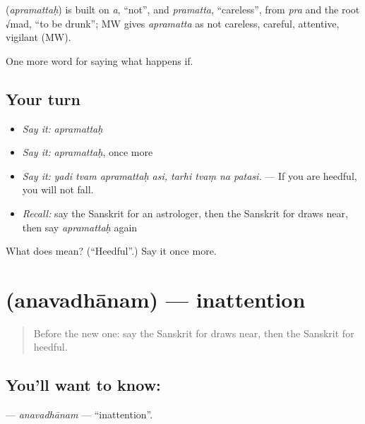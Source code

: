 \begin{cousinweb}
\textbf{} (\emph{apramattaḥ}) is built on \emph{a}, \textquotedblleft{}not\textquotedblright{}, and \emph{pramatta}, \textquotedblleft{}careless\textquotedblright{}, from \emph{pra} and the root √mad, \textquotedblleft{}to be drunk\textquotedblright{}; MW gives \emph{apramatta} as not careless, careful, attentive, vigilant (MW).
\end{cousinweb}

\begin{grammarlens}[title={What you've built}]
One more word for saying what happens if.
\end{grammarlens}

\subsection*{Your turn}
\begin{itemize}
\raggedright
  \item \emph{Say it:} \emph{apramattaḥ}
  \item \emph{Say it:} \emph{apramattaḥ}, once more
  \item \emph{Say it:} \emph{yadi tvam apramattaḥ asi, tarhi tvaṃ na patasi.} — If you are heedful, you will not fall.
  \item \emph{Recall:} say the Sanskrit for an astrologer, then the Sanskrit for draws near, then say \emph{apramattaḥ} again
\end{itemize}

\begin{tcolorbox}[breakable,colback=teal!4,colframe=teal!35!black,title={Before you move on}]
What does  mean? (\textquotedblleft{}Heedful\textquotedblright{}.) Say it once more.
\end{tcolorbox}
\section[\texorpdfstring{\sk{अनवधानम्} (anavadhānam)}{अनवधानम् (anavadhānam)}]{ (anavadhānam) — inattention}

\label{lesson:SA-C539-anavadhanam}



\begin{quote}
Before the new one: say the Sanskrit for draws near, then the Sanskrit for heedful.
\end{quote}

\subsection*{You'll want to know: }
\textbf{} — \emph{anavadhānam} — \textquotedblleft{}inattention\textquotedblright{}.

